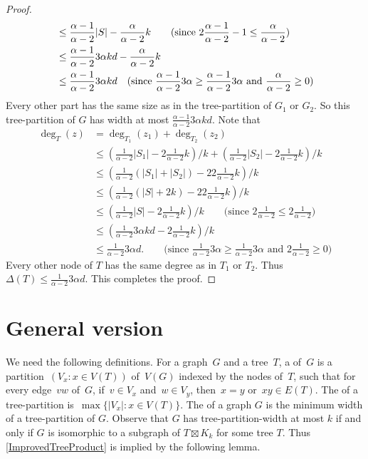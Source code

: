 \begin{proof}
\begin{align*}
    & \leq \frac{\alpha-1}{\alpha-2} |S| -  \frac{\alpha}{\alpha-2}  k\qquad \text{(since $ 2\frac{\alpha-1}{\alpha-2} -1 \leq  \frac{\alpha}{\alpha-2} $)}\\
    & \leq \frac{\alpha-1}{\alpha-2}  3 \alpha   kd -  \frac{\alpha}{\alpha-2}  k \\
    & \leq \frac{\alpha-1}{\alpha-2}  3 \alpha    kd \quad \text{(since $\frac{\alpha-1}{\alpha-2}  3 \alpha    \geq \frac{\alpha-1}{\alpha-2} 3 \alpha  $ and $ \frac{\alpha}{\alpha-2} \geq 0$)}
\end{align*}
Every other part has the same size as in the tree-partition of $G_1$ or $G_2$. So this tree-partition of $G$ has width at most $\frac{\alpha-1}{\alpha-2}  3 \alpha   kd$. 
Note that 
\begin{align*}
 \deg_T(z)  & = \deg_{T_1}(z_1) + \deg_{T_2}(z_2)\\
    & \leq  (\frac{1}{\alpha-2}|S_1|-2 \frac{1}{\alpha-2} k)/k + (\frac{1}{\alpha-2}|S_2|-2 \frac{1}{\alpha-2} k)/k\\
    & \leq  (\frac{1}{\alpha-2}(|S_1|+|S_2|)-22 \frac{1}{\alpha-2} k)/k\\
    & \leq  (\frac{1}{\alpha-2}(|S|+2k)-22 \frac{1}{\alpha-2} k)/k\\
    & \leq  (\frac{1}{\alpha-2}|S|-2 \frac{1}{\alpha-2} k)/k \qquad \text{(since $2\frac{1}{\alpha-2}  \leq  2 \frac{1}{\alpha-2} $)}\\
    & \leq  (\frac{1}{\alpha-2}3 \alpha  kd-2 \frac{1}{\alpha-2} k)/k \\
    & \leq  \frac{1}{\alpha-2} 3 \alpha    d. \qquad \text{(since $\frac{1}{\alpha-2} 3 \alpha    \geq \frac{1}{\alpha-2}3 \alpha  $ and $2 \frac{1}{\alpha-2}  \geq 0$)}
\end{align*}
Every other node of $T$ has the same degree as in $T_1$ or $T_2$. 
Thus $\Delta(T) \leq \frac{1}{\alpha-2} 3 \alpha   d$. This completes the proof.
\end{proof}


\section{General version}


We need the following definitions. For a graph~$G$ and a tree~$T$, a  of~$G$ is a partition~${(V_x \colon x\in V(T))}$ of~${V(G)}$ indexed by the nodes of~$T$, such that for every edge~${vw}$ of~$G$, if~${v \in V_x}$ and~${w \in V_y}$, then~${x = y}$ or~${xy \in E(T)}$. The  of a tree-partition is~${\max\{ |{V_x}| \colon x \in V(T)\}}$. The  of a graph $G$ is the minimum width of a tree-partition of $G$. Observe that $G$ has tree-partition-width at most $k$ if and only if $G$ is isomorphic to a subgraph of $T\boxtimes K_k$ for some tree $T$. Thus \cref{ImprovedTreeProduct} is implied by the following lemma.

